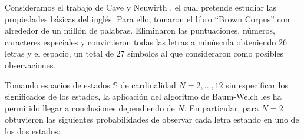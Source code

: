 
\begin{exampleth}
Consideramos el trabajo de Cave y Neuwirth \cite{Cave}, el cual pretende estudiar las propiedades básicas del inglés. Para ello, tomaron el libro \enquote{Brown Corpus} con alrededor de un millón de palabras. Eliminaron las puntuaciones, números, caracteres especiales y convirtieron todas las letras a minúscula obteniendo $26$ letras y el espacio, un total de 27 símbolos al que consideraron como posibles observaciones.

Tomando espacios de estados $\mathbb{S}$ de cardinalidad $N=2,\dots,12$ sin especificar los significados de los estados, la aplicación del algoritmo de Baum-Welch les ha permitido llegar a conclusiones dependiendo de $N$. En particular, para $N=2$ obtuvieron las siguientes probabilidades de observar cada letra estando en uno de los dos estados:


\end{exampleth}
